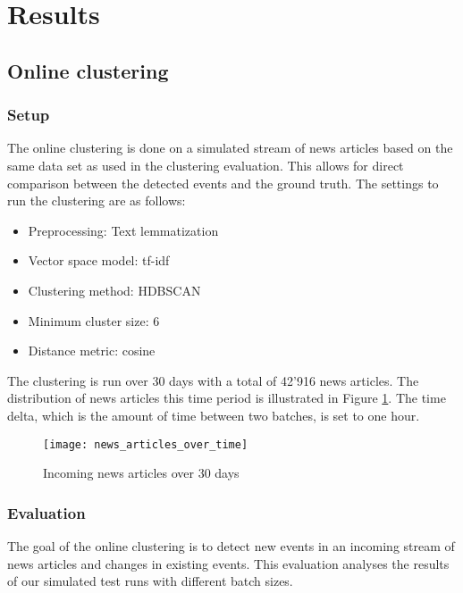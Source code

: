 \section{Results}

\subsection{Online clustering}

\subsubsection{Setup}

The online clustering is done on a simulated stream of news articles based on the same data set as used in the clustering evaluation. This allows for direct comparison between the detected events and the ground truth. The settings to run the clustering are as follows:

\begin{itemize}
    \item Preprocessing: Text lemmatization
    \item Vector space model: tf-idf
    \item Clustering method: HDBSCAN
    \item Minimum cluster size: 6
    \item Distance metric: cosine
\end{itemize}

The clustering is run over 30 days with a total of 42'916 news articles. The distribution of news articles this time period is illustrated in Figure \ref{fig:news_articles_over_time}. The time delta, which is the amount of time between two batches, is set to one hour. 

\begin{figure}[h]
    \centering
    \texttt{[image: news\_articles\_over\_time]}
    \caption{Incoming news articles over 30 days}
    \label{fig:news_articles_over_time}
\end{figure}

\subsubsection{Evaluation}

The goal of the online clustering is to detect new events in an incoming stream of news articles and changes in existing events. This evaluation analyses the results of our simulated test runs with different batch sizes.

